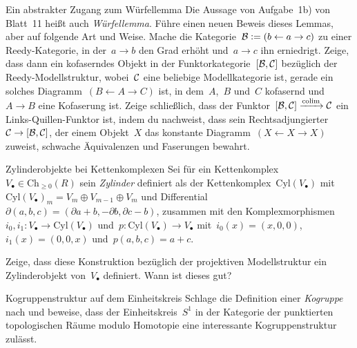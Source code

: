 \documentclass{uebblatt}
\newcommand{\Ch}{\mathrm{Ch}}
\newcommand{\Cyl}{\mathrm{Cyl}}
\begin{document}

\begin{aufgabe}{Ein abstrakter Zugang zum Würfellemma}
Die Aussage von Aufgabe~1b) von Blatt~11 heißt auch \emph{Würfellemma}. Führe
einen neuen Beweis dieses Lemmas, aber auf folgende Art und Weise. Mache die
Kategorie~$\mathcal{B} \vcentcolon= (b \leftarrow a \rightarrow c)$ zu einer Reedy-Kategorie,
in der~$a \to b$ den Grad erhöht und~$a \to c$ ihn erniedrigt. Zeige, dass dann
ein kofaserndes Objekt in der Funktorkategorie~$[\mathcal{B},\mathcal{C}]$ bezüglich der
Reedy-Modellstruktur, wobei~$\mathcal{C}$ eine beliebige Modellkategorie ist, gerade ein
solches Diagramm~$(B \leftarrow A \rightarrow C)$ ist, in dem~$A$,~$B$ und~$C$ kofasernd
und~$A \to B$ eine Kofaserung ist. Zeige schließlich, dass der Funktor~$[\mathcal{B},\mathcal{C}]
\xrightarrow{\operatorname*{colim}} \mathcal{C}$ ein Links-Quillen-Funktor ist, indem du nachweist, dass sein
Rechtsadjungierter~$\mathcal{C} \to [\mathcal{B},\mathcal{C}]$, der einem Objekt~$X$ das konstante
Diagramm~$(X \leftarrow X \rightarrow X)$ zuweist, schwache Äquivalenzen und
Faserungen bewahrt.
\end{aufgabe}

\begin{aufgabe}{Zylinderobjekte bei Kettenkomplexen}
Sei für ein Kettenkomplex~$V_\bullet \in \Ch_{\geq0}(R)$ sein \emph{Zylinder}
definiert als der Kettenkomplex~$\Cyl(V_\bullet)$ mit~$\Cyl(V_\bullet)_m = V_m
\oplus V_{m-1} \oplus V_m$ und Differential~$\partial(a,b,c) = (\partial a + b,
-\partial b, \partial c - b)$, zusammen mit den Komplexmorphismen~$i_0, i_1 :
V_\bullet \to \Cyl(V_\bullet)$ und~$p : \Cyl(V_\bullet) \to V_\bullet$
mit~$i_0(x) = (x,0,0)$, $i_1(x) = (0,0,x)$ und~$p(a,b,c) = a+c$.

Zeige, dass diese Konstruktion bezüglich der projektiven Modellstruktur ein
Zylinderobjekt von~$V_\bullet$ definiert. Wann ist dieses gut?
\end{aufgabe}

\begin{aufgabe}{Kogruppenstruktur auf dem Einheitskreis}
Schlage die Definition einer \emph{Kogruppe} nach und beweise, dass der
Einheitskreis~$S^1$ in der Kategorie der punktierten topologischen Räume
modulo Homotopie eine interessante Kogruppenstruktur zulässt.
\end{aufgabe}
\end{document}
